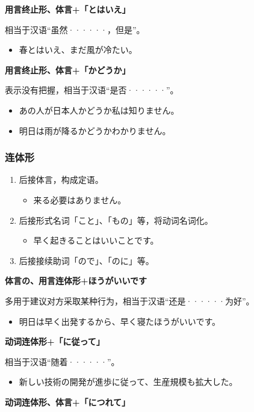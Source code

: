 {\bf
\noindent 用言终止形、体言+「とはいえ」
}

相当于汉语``虽然······，但是''。
\begin{itemize}
  \item 春とはいえ、まだ風が冷たい。
\end{itemize}

{\bf
\noindent 用言终止形、体言+「かどうか」
}

表示没有把握，相当于汉语``是否······''。
\begin{itemize}
  \item あの人が日本人かどうか私は知りません。
  \item 明日は雨が降るかどうかわかりません。
\end{itemize}


\subsubsection{连体形}%

\begin{enumerate}
  \item 后接体言，构成定语。
    \begin{itemize}
      \item 来る必要はありません。
    \end{itemize}
  \item 后接形式名词「こと」、「もの」等，将动词名词化。
    \begin{itemize}
      \item 早く起きることはいいことです。
    \end{itemize}
  \item 后接接续助词「ので」、「のに」等。
\end{enumerate}

{\bf
\noindent 体言の、用言连体形+ほうがいいです
}

多用于建议对方采取某种行为，相当于汉语``还是······为好''。
\begin{itemize}
  \item 明日は早く出発するから、早く寝たほうがいいです。
\end{itemize}

{\bf
\noindent 动词连体形+「に従って」
}

相当于汉语``随着······''。
\begin{itemize}
  \item 新しい技術の開発が進歩に従って、生産規模も拡大した。
\end{itemize}

{\bf
\noindent 动词连体形、体言+「につれて」
}

